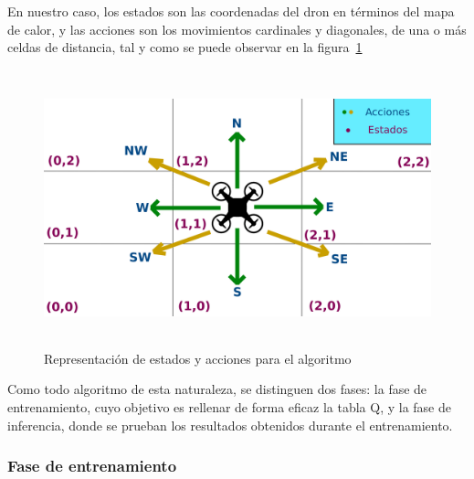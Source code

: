 En nuestro caso, los estados son las coordenadas del dron en términos del mapa de calor, y las acciones son los movimientos cardinales y diagonales, de una o más celdas de distancia, tal y como se puede observar en la figura~\ref{fig:expl_q}\\

\begin{figure} [H]
    \begin{center}
    \includegraphics[height=8cm]{imagenes/cap4/6_act_st.png}
    \end{center}
    \caption[Representación de estados y acciones para el algoritmo]{Representación de estados y acciones para el algoritmo}
    \label{fig:expl_q}
\end{figure}

Como todo algoritmo de esta naturaleza, se distinguen dos fases: la fase de entrenamiento, cuyo objetivo es rellenar de forma eficaz la tabla Q, y la fase de inferencia, donde se prueban los resultados obtenidos durante el entrenamiento.\\

\subsubsection{Fase de entrenamiento}
\label{subsubsec:train}

